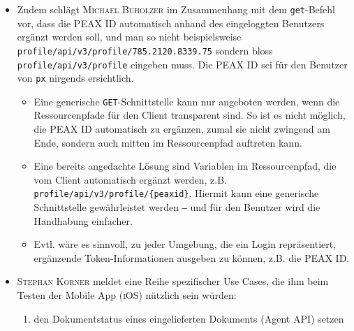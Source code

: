\begin{itemize}
\begin{itemize}
        \item \textsc{Go} bietet mit \texttt{json.Indent} eine sehr komfortable Funktion, womit ein beliebiger JSON-Payload\footnote{D.h. nicht nur ein JSON-Payload, dessen Struktur mittels einer \texttt{struct} und den entsprechenden Annotations beschrieben ist, was zu einem unverhältnismässigen Mehraufwand führen würde, zumal dann jeder mögliche Payload statisch beschrieben sein müsste.} einfach formatiert werden kann.
        \item Der Vorschlag kommt ins Backlog ‒ jedoch mit tiefer Priorität, da das Problem mithilfe von \texttt{jq} einfach gelöst werden kann. Weitere Features im Zusammenhang mit generischer JSON-Verarbeitung sollen der \textsc{Unix}-Philosophie entsprechend an \texttt{jq} oder ähnliche Programme mittels Pipe delegiert werden.
    \end{itemize}
\item Zudem schlägt \textsc{Michael Buholzer} im Zusammenhang mit dem \texttt{get}-Befehl vor, dass die PEAX ID automatisch anhand des eingeloggten Benutzers ergänzt werden soll, und man so nicht beispielsweise \texttt{profile/api/v3/profile/785.2120.8339.75} sondern bloss \texttt{profile/api/v3/profile} eingeben muss. Die PEAX ID sei für den Benutzer von \texttt{px} nirgends ersichtlich.
    \begin{itemize}
        \item Eine generische \texttt{GET}-Schnittstelle kann nur angeboten werden, wenn die Ressourcenpfade für den Client transparent sind. So ist es nicht möglich, die PEAX ID automatisch zu ergänzen, zumal sie nicht zwingend am Ende, sondern auch mitten im Ressourcenpfad auftreten kann.
        \item Eine bereits angedachte Lösung sind Variablen im Ressourcenpfad, die vom Client automatisch ergänzt werden, z.B. \texttt{profile/api/v3/profile/\{peaxid\}}. Hiermit kann eine generische Schnittstelle gewährleistet werden ‒ und für den Benutzer wird die Handhabung einfacher.
        \item Evtl. wäre es sinnvoll, zu jeder Umgebung, die ein Login repräsentiert, ergänzende Token-Informationen ausgeben zu können, z.B. die PEAX ID.
    \end{itemize}
    \item \textsc{Stephan Korner} meldet eine Reihe spezifischer Use Cases, die ihm beim Testen der Mobile App (\textsc{iOS}) nützlich sein würden:
        \begin{enumerate}
            \item den Dokumentstatus eines eingelieferten Dokuments (Agent API) setzen

\end{enumerate}
\end{itemize}
